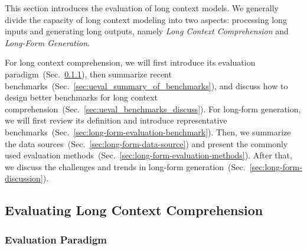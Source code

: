\documentclass[11pt, a4paper, logo, copyright, nonumbering]{map}
\begin{document}
\newcommand{\ColoredBoxR}[1]{%
    \IfStrEqCase{#1}{%
        {RQA}{\boxedR[fill=blue!10]{1} }%
        {RSum}{\boxedR[fill=green!10]{2} }%
        {RDRR}{\boxedR[fill=orange!10]{3} }%
        {RRAG}{\boxedR[fill=red!10]{4} }%
        {RICL}{\boxedR[fill=purple!10]{5} }%
        {RCode}{\boxedR[fill=cyan!10]{6} }%
        {S}{\boxedR[fill=yellow!10]{S} }%
    }%
}





This section introduces the evaluation of long context models. We generally divide the capacity of long context modeling into two aspects: processing long inputs and generating long outputs, namely \textit{Long Context Comprehension} and \textit{Long-Form Generation}. 


For long context comprehension, we will first introduce its evaluation paradigm~(Sec.~\ref{sec:ueval_paradigm}), then summarize recent benchmarks~(Sec.~\ref{sec:ueval_summary_of_benchmarks}), and discuss how to design better benchmarks for long context comprehension~(Sec.~\ref{sec:ueval_benchmarks_discuss}). For long-form generation, we will first review its definition and introduce representative benchmarks~(Sec.~\ref{sec:long-form-evaluation-benchmark}). Then, we summarize the data sources~(Sec.~\ref{sec:long-form-data-source}) and present the commonly
used evaluation methods~(Sec.~\ref{sec:long-form-evaluation-methods}). After that, we discuss the challenges and trends in
long-form generation~(Sec.~\ref{sec:long-form-discussion}).


\subsection{Evaluating Long Context Comprehension}

\subsubsection{Evaluation Paradigm}
\label{sec:ueval_paradigm}
\end{document}
